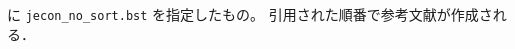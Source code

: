 \documentclass[10pt]{jarticle}
\begin{document}
\verb|| に \verb|jecon_no_sort.bst| を指定したもの。
引用された順番で参考文献が作成される．
\vspace*{1em}\\



\nocite{*}




\end{document}
